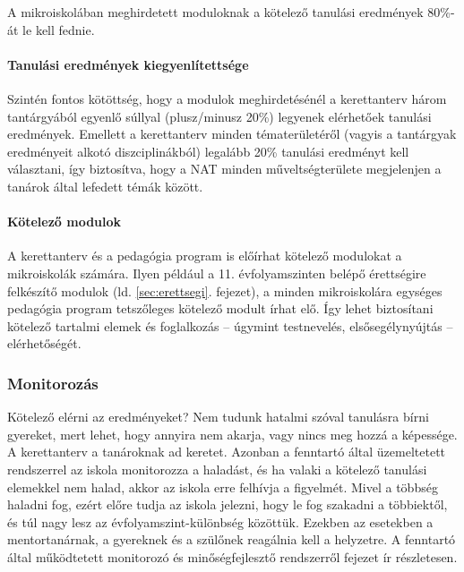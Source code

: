 A mikroiskolában meghirdetett moduloknak a kötelező tanulási eredmények 80\%-át le kell fednie.

\paragraph{Tanulási eredmények kiegyenlítettsége}

Szintén fontos kötöttség, hogy a modulok meghirdetésénél a kerettanterv három tantárgyából egyenlő súllyal (plusz/minusz 20\%) legyenek elérhetőek tanulási eredmények. Emellett a kerettanterv minden tématerületéről (vagyis a tantárgyak eredményeit alkotó diszciplinákból) legalább 20\% tanulási eredményt kell választani, így biztosítva, hogy a NAT minden műveltségterülete megjelenjen a tanárok által lefedett témák között.

\paragraph{Kötelező modulok}
A kerettanterv és a pedagógia program is előírhat kötelező modulokat a mikroiskolák számára. Ilyen például a 11. évfolyamszinten belépő érettségire felkészítő modulok (ld. \ref{sec:erettsegi}. fejezet), a minden mikroiskolára egységes pedagógia program tetszőleges kötelező modult írhat elő. Így lehet biztosítani kötelező tartalmi elemek és foglalkozás -- úgymint testnevelés, elsősegélynyújtás -- elérhetőségét.

\subsubsection{Monitorozás}

Kötelező elérni az eredményeket? Nem tudunk hatalmi szóval tanulásra bírni gyereket, mert lehet, hogy annyira nem akarja, vagy nincs meg hozzá a képessége. A kerettanterv a tanároknak ad keretet. Azonban a fenntartó által üzemeltetett rendszerrel az iskola  monitorozza a haladást, és ha valaki a kötelező tanulási elemekkel nem halad, akkor az iskola erre felhívja a figyelmét. Mivel a többség haladni fog, ezért előre tudja az iskola jelezni, hogy le fog szakadni a többiektől, és túl nagy lesz az évfolyamszint-különbség közöttük. Ezekben az esetekben a mentortanárnak, a gyereknek és a szülőnek reagálnia kell a helyzetre. A fenntartó által működtetett monitorozó és minőségfejlesztő rendszerről  fejezet ír részletesen.